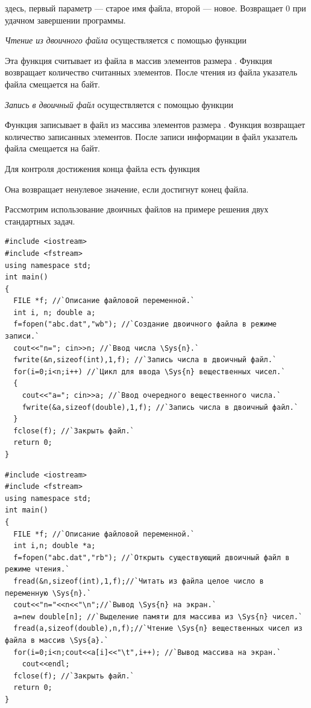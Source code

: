здесь, первый параметр --- старое имя файла, второй --- новое. Возвращает 0 при удачном завершении программы.

\emph{Чтение из двоичного файла} осуществляется с помощью функции


Эта функция считывает из файла  в массив   
элементов размера . Функция возвращает количество считанных элементов. После чтения из файла
указатель файла смещается на  байт.

\emph{Запись в двоичный файл} осуществляется с помощью функции


Функция записывает в файл  из массива   элементов
размера . Функция возвращает количество записанных элементов. После записи информации в файл
указатель файла смещается на  байт.

Для контроля достижения конца файла есть функция


Она возвращает ненулевое значение, если достигнут конец файла.

Рассмотрим использование двоичных файлов на примере решения двух стандартных задач.

\begin{lstlisting}
#include <iostream>
#include <fstream>
using namespace std;
int main()
{
  FILE *f; //`Описание файловой переменной.`
  int i, n; double a;
  f=fopen("abc.dat","wb"); //`Создание двоичного файла в режиме записи.`
  cout<<"n="; cin>>n; //`Ввод числа \Sys{n}.`
  fwrite(&n,sizeof(int),1,f); //`Запись числа в двоичный файл.`
  for(i=0;i<n;i++) //`Цикл для ввода \Sys{n} вещественных чисел.`
  {
    cout<<"a="; cin>>a; //`Ввод очередного вещественного числа.`
    fwrite(&a,sizeof(double),1,f); //`Запись числа в двоичный файл.`
  }
  fclose(f); //`Закрыть файл.`
  return 0;
}
\end{lstlisting}

\begin{lstlisting}
#include <iostream>
#include <fstream>
using namespace std;
int main()
{
  FILE *f; //`Описание файловой переменной.`
  int i,n; double *a;
  f=fopen("abc.dat","rb"); //`Открыть существующий двоичный файл в режиме чтения.`
  fread(&n,sizeof(int),1,f);//`Читать из файла целое число в переменную \Sys{n}.`
  cout<<"n="<<n<<"\n";//`Вывод \Sys{n} на экран.`
  a=new double[n]; //`Выделение памяти для массива из \Sys{n} чисел.`
  fread(a,sizeof(double),n,f);//`Чтение \Sys{n} вещественных чисел из файла в массив \Sys{a}.`
  for(i=0;i<n;cout<<a[i]<<"\t",i++); //`Вывод массива на экран.`
    cout<<endl;
  fclose(f); //`Закрыть файл.`
  return 0;
}
\end{lstlisting}

